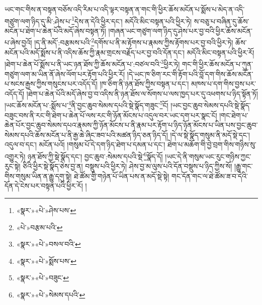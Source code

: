 ཡང་གང་གིས་ན་བསྟན་བཅོས་འདི་རིམ་པ་འདི་ལྟར་བསྟན་ན་གང་གི་ཕྱིར་ཆོས་མངོན་པ་སྨོས་པ་མེད་ན་འདི་གཙུག་ལག་ཉིད་དུ་མི་:ཤེས་པ་\footnote{«སྣར་»«པེ་»ཤེས་པས་}དེས་ན་དེའི་ཕྱིར་དང་། མདོའི་མིང་བསྟན་པའི་ཕྱིར་ཏེ། ས་བཅུ་པ་བཞིན་དུ་ཆོས་མངོན་པ་ཐེག་པ་ཆེན་པོའི་མདོ་ཞེས་བསྟན་ཏོ། །གཞན་ཡང་གཙུག་ལག་ཉིད་དུ་ཤེས་པར་བྱ་བའི་ཕྱིར་ཆོས་མངོན་པ་ཞེས་བྱའོ། །ད་ནི་མདོ་:བརྩམས་པའི་\footnote{«པེ་»བརྩམ་པའི་}དགོས་པ་ནི་མ་རྟོགས་པ་རྣམས་ཀྱིས་རྟོགས་པར་བྱ་བའི་ཕྱིར་ཏེ། ཆོས་མངོན་པའི་མདོ་སྨོས་པ་ནི་འདིས་ཆོས་ཀྱི་རྣམ་གྲངས་བརྗོད་པར་བྱ་བའི་དོན་དང་། མདོའི་མིང་བསྟན་པའི་ཕྱིར་རོ། །ཐེག་པ་ཆེན་པོ་སྨོས་པ་ནི་ཡང་ཉན་ཐོས་ཀྱི་ཆོས་མངོན་པ་:བཙལ་བའི་\footnote{«སྣར་»«པེ་»བསལ་བའི་}ཕྱིར་ཏེ། གང་གི་ཕྱིར་ཆོས་མངོན་པ་ཀུན་གཙུག་ལག་མ་ཡིན་ནོ་ཞེས་ལོག་པར་རྟོག་པའི་ཕྱིར་རོ། །དེ་ཡང་ཁ་ཅིག་རང་གི་རྟོག་པའི་བློ་དག་གིས་ཆོས་མངོན་པ་སངས་རྒྱས་ཀྱིས་གསུངས་པར་འདོད་དོ། །ཁ་ཅིག་ནི་ཉན་ཐོས་ཀྱིས་བསྟན་པ་དང་། མཁས་པ་དག་གིས་བྱས་པར་འདོད་དོ། །ཐེག་པ་ཆེན་པོའི་མདོ་ཞེས་བྱ་བ་འདིས་ནི་ཉན་ཐོས་ལ་སོགས་པ་ལས་ཁྱད་པར་དུ་འཕགས་པ་ཉིད་སྟོན་ཏོ། །ཡང་ཆོས་མངོན་པ་:སྨོས་པ་\footnote{«སྣར་»«པེ་»སྨོས་པས་}ནི་བྱང་ཆུབ་སེམས་དཔའི་སྡེ་སྣོད་གཟུང་\footnote{«སྣར་»«པེ་»བཟུང་}ངོ། །ཡང་བྱང་ཆུབ་སེམས་དཔའི་སྡེ་སྣོད་བཟུང་བས་ནི་རང་གི་ཐེག་པ་ཆེན་པོ་ལས་རང་གི་ཉོན་མོངས་པ་འདུལ་བར་ཡང་དག་པར་སྣང་ངོ། །གང་ཐེག་པ་ཆེན་པོར་བྱང་ཆུབ་སེམས་དཔའ་རྣམས་ཀྱི་ཉོན་མོངས་པ་ནི་རྣམ་པར་རྟོག་པ་ཉིད་ཉོན་མོངས་པ་ཡིན་པས་བྱང་ཆུབ་སེམས་དཔའི་ཆོས་མངོན་པ་ནི་རྒྱ་ཆེ་ཞིང་ཟབ་པའི་མཚན་ཉིད་ཅན་ཉིད་དོ། །དེ་ལ་སྡེ་སྣོད་གསུམ་ནི་མདོ་སྡེ་དང་། འདུལ་བ་དང་། མངོན་པའོ། །གསུམ་པོ་དེ་དག་ཉིད་ཐེག་པ་དམན་པ་དང་། ཐེག་པ་མཆོག་གི་བྱེ་བྲག་གིས་གཉིས་སུ་འགྱུར་ཏེ། ཉན་ཐོས་ཀྱི་སྡེ་སྣོད་དང་། བྱང་ཆུབ་:སེམས་དཔའི་སྡེ་\footnote{«སྣར་»«པེ་»སེམས་དཔའི་}སྣོད་དོ། །ཡང་དེ་ནི་གསུམ་ཡང་རུང་གཉིས་ཀྱང་རུང་སྟེ། ཅིའི་ཕྱིར་སྡེ་སྣོད་ཅེས་བྱ་ན། བསྡུས་པའི་ཕྱིར་ཏེ། ཤེས་བྱ་མ་ལུས་པའི་དོན་བསྡུས་པ་ཉིད་ཀྱིས་སོ། །རྒྱུ་གང་གིས་གསུམ་ཡིན་ན་རྒྱུ་དགུ་སྟེ། ཐེ་ཚོམ་གྱི་གཉེན་པོ་ཡིན་པས་ན་མདོ་སྡེ་སྟེ། གང་དོན་གང་ལ་ཐེ་ཚོམ་ཟ་བ་དེའི་དོན་དེ་ངེས་པར་བསྟན་པའི་ཕྱིར་རོ། །
